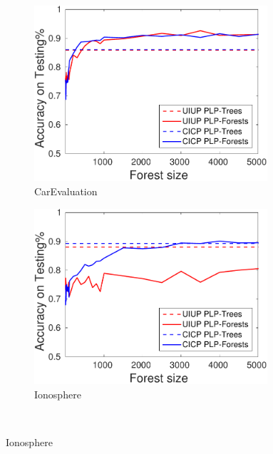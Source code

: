 {
  \begin{figure}
    \centering
    \begin{subfigure}[b]{0.3\textwidth}
      \centering
      \includegraphics[width=0.95\textwidth]{figs/PrefLearnResults/Forests/CarEvaluation_Forests_MH.pdf}
			\captionsetup{font=scriptsize}
      \caption{CarEvaluation}
    \end{subfigure}
    \begin{subfigure}[b]{0.3\textwidth}
      \centering
      \includegraphics[width=0.95\textwidth]{figs/PrefLearnResults/Forests/IonosphereDownsampledFurther_Forests_MH.pdf}
			\captionsetup{font=scriptsize}
      \caption{Ionosphere}
    \end{subfigure}\\\vspace{0.3cm}

\end{figure}}
